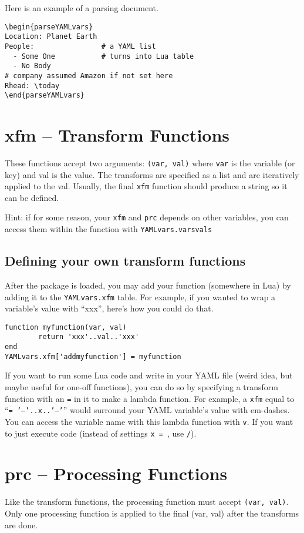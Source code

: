 \documentclass[11pt,parskip=half]{scrartcl}
\begin{document}
Here is an example of a parsing document.


\begin{verbatim}
\begin{parseYAMLvars}
Location: Planet Earth
People:                # a YAML list
  - Some One           # turns into Lua table
  - No Body
# company assumed Amazon if not set here
Rhead: \today
\end{parseYAMLvars}
\end{verbatim}


 \section{xfm -- Transform Functions}
These functions accept two arguments: \texttt{(var, val)} where \texttt{var} is the variable (or key) and val is the value.
The transforms are specified as a list and are iteratively applied to the val.
Usually, the final \texttt{xfm} function should produce a string so it can be defined.

Hint: if for some reason, your \texttt{xfm} and \texttt{prc} depends on other variables,
you can access them within the function
with \texttt{YAMLvars.varsvals}

\subsection{Defining your own transform functions}
After the package is loaded, you may add your function (somewhere in Lua)
by adding it to the \texttt{YAMLvars.xfm} table.
For example, if you wanted to wrap a variable's value with ``xxx'', here's how you could do that.
\begin{verbatim}
function myfunction(var, val)
        return 'xxx'..val..'xxx'
end
YAMLvars.xfm['addmyfunction'] = myfunction
\end{verbatim}

If you want to run some Lua code and write in your YAML file (weird idea, but maybe useful for one-off functions),
you can do so by specifying a transform function with an \texttt{=} in it to make a lambda function.
For example, a \texttt{xfm} equal to
``\texttt{= '---'..x..'---'}''
would surround your YAML variable's value with em-dashes.
You can access the variable name with this lambda function with \texttt{v}.
If you want to just execute code (instead of settings \texttt{x = }, use \texttt{/}).

  \section{prc -- Processing Functions}
Like the transform functions, the processing function must accept \texttt{(var, val)}.
Only one processing function is applied to the final (var, val) after the transforms are done.
\end{document}
